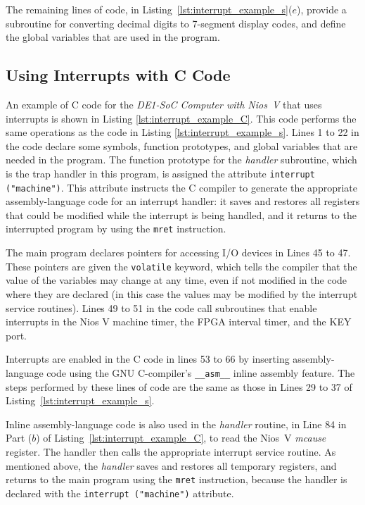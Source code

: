 \documentclass[11pt, twoside, pdftex]{article}
\newcommand{\systemNameFull}{DE1-SoC Computer with Nios~V}
\begin{document}
The remaining lines of code, in Listing~\ref{lst:interrupt_example_s}($e$),
provide a subroutine for converting decimal digits to 7-segment display codes,
and define the global variables that are used in the program.

\subsection{Using Interrupts with C Code}

An example of C code for the {\it \systemNameFull} that uses interrupts is shown in 
Listing \ref{lst:interrupt_example_C}. This code performs the same operations as
the code in Listing \ref{lst:interrupt_example_s}. Lines 1 to 22 in the code declare some symbols, 
function prototypes, and global variables that are needed in the program. The function
prototype for the {\it handler} subroutine, which is the trap handler in this program, is
assigned the attribute \texttt{interrupt ("machine")}. This attribute instructs the C compiler 
to generate the appropriate assembly-language code for an interrupt handler: it saves and 
restores all registers that could be modified while the interrupt is being handled, and it 
returns to the interrupted program by using the \texttt{mret} instruction. 

The main program declares pointers for accessing I/O devices in Lines 45 to 47. These
pointers are given the \texttt{volatile} keyword, which tells the compiler that the
value of the variables may change at any time, even if not modified in the code where
they are declared (in this case the values may be modified by the interrupt service routines). 
Lines 49 to 51 in the code call subroutines that enable interrupts in the Nios V machine
timer, the FPGA interval timer, and the KEY port. 

Interrupts are enabled in the C code in lines 53 to 66 by inserting assembly-language code 
using the GNU C-compiler's \texttt{\_\_asm\_\_} inline assembly feature. The steps performed by
these lines of code are the same as those in Lines 29 to 37 of 
Listing~\ref{lst:interrupt_example_s}.

Inline assembly-language code is also used in the {\it handler} routine, in Line 84 in 
Part ($b$) of Listing~\ref{lst:interrupt_example_C}, to read the Nios~V {\it mcause} register.
The handler then calls the appropriate interrupt service routine. As mentioned above, the
{\it handler} saves and restores all temporary registers, and returns to the main program 
using the \texttt{mret} instruction, because the
handler is declared with the \texttt{interrupt ("machine")} attribute.
\end{document}
